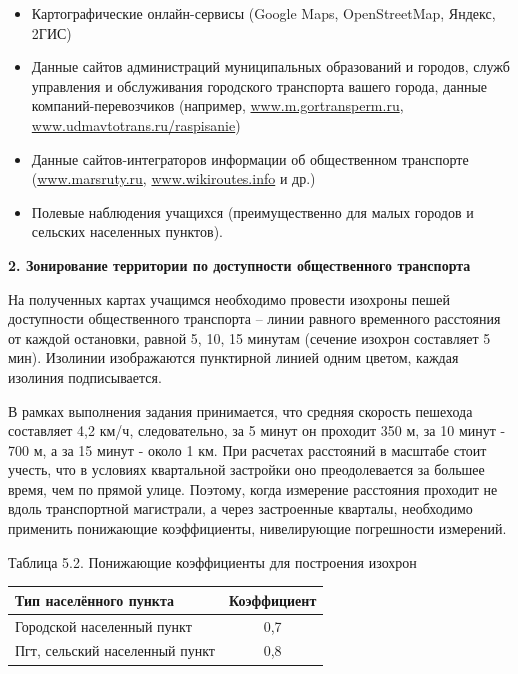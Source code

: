 \documentclass[
  11pt,
]{book}
\begin{document}
\begin{itemize}
\item
  Картографические онлайн-сервисы (Google Maps, OpenStreetMap, Яндекс, 2ГИС)
\item
  Данные сайтов администраций муниципальных образований и городов, служб управления и обслуживания городского транспорта вашего города, данные компаний-перевозчиков (например, \href{http://www.m.gortransperm.ru}{www.m.gortransperm.ru}, \href{http://www.udmavtotrans.ru/raspisanie}{www.udmavtotrans.ru/raspisanie})
\item
  Данные сайтов-интеграторов информации об общественном транспорте (\href{http://www.marsruty.ru}{www.marsruty.ru}, \href{http://www.wikiroutes.info}{www.wikiroutes.info} и др.)
\item
  Полевые наблюдения учащихся (преимущественно для малых городов и сельских населенных пунктов).
\end{itemize}

\textbf{2. Зонирование территории по доступности общественного транспорта}

На полученных картах учащимся необходимо провести изохроны пешей доступности общественного
транспорта -- линии равного временного расстояния от каждой остановки, равной 5, 10, 15 минутам (сечение изохрон составляет 5 мин). Изолинии изображаются
пунктирной линией одним цветом, каждая изолиния подписывается.

В рамках выполнения задания принимается, что средняя скорость пешехода составляет 4,2 км/ч,
следовательно, за 5 минут он проходит 350 м, за 10 минут - 700 м, а за 15 минут - около 1 км. При расчетах расстояний в масштабе стоит учесть, что в условиях квартальной застройки оно преодолевается за большее время, чем по прямой улице. Поэтому, когда измерение расстояния проходит не вдоль транспортной магистрали, а через застроенные кварталы, необходимо применить понижающие коэффициенты, нивелирующие погрешности измерений.

Таблица 5.2. Понижающие коэффициенты для построения изохрон

\begin{longtable}[]{@{}lc@{}}
\toprule\noalign{}
Тип населённого пункта & Коэффициент \\
\midrule\noalign{}
\endhead
\bottomrule\noalign{}
\endlastfoot
Городской населенный пункт & 0,7 \\
Пгт, сельский населенный пункт & 0,8 \\
\end{longtable}
\end{document}
